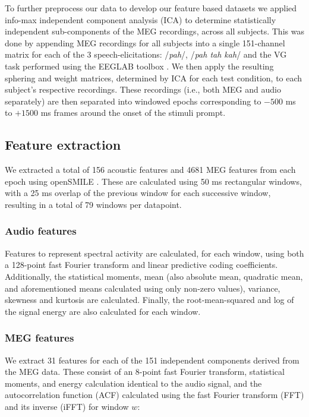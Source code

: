 \documentclass[utf8]{frontiersSCNS} %
\begin{document}
To further preprocess our data to develop our feature based datasets we applied info-max independent component analysis (ICA) \cite{Bell1995} to determine statistically independent sub-components of the MEG recordings, across all subjects. This was done by appending MEG recordings for all subjects into a single 151-channel matrix for each of the 3 speech-elicitations: /{\em pah}/, /{\em pah tah kah}/ and the VG task performed using the EEGLAB toolbox \cite{Delorme04eeglab}. We then apply the resulting sphering and weight matrices, determined by ICA for each test condition, to each subject's respective recordings. These recordings (i.e., both MEG and audio separately) are then separated into windowed epochs corresponding to $-500$ ms to $+1500$ ms frames around the onset of the stimuli prompt.

\subsection{Feature extraction}

We extracted a total of 156 acoustic features and 4681 MEG features from each epoch using openSMILE \cite{Eyben13-RDI}. These are calculated using 50 ms rectangular windows, with a 25 ms overlap of the previous window for each successive window, resulting in a total of 79 windows per datapoint.

\subsubsection{Audio features}

Features to represent spectral activity are calculated, for each window, using both a 128-point fast Fourier transform and linear predictive coding coefficients. Additionally, the statistical moments, mean (also absolute mean, quadratic mean, and aforementioned means calculated using only non-zero values), variance, skewness and kurtosis are calculated. Finally, the root-mean-squared and log of the signal energy are also calculated for each window.

\subsubsection{MEG features}

We extract 31 features for each of the 151 independent components derived from the MEG data. These consist of an 8-point fast Fourier transform, statistical moments, and energy calculation identical to the audio signal, and the autocorrelation function (ACF) calculated using the fast Fourier transform (FFT) and its inverse (iFFT) for window $w$:
\end{document}
